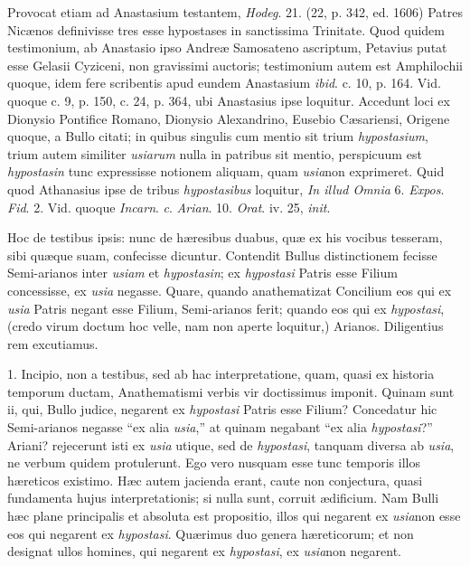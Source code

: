 Provocat
etiam ad Anastasium testantem, \emph{Hodeg}. 21. (22, p. 342, ed.
1606) Patres Nicænos definivisse tres esse hypostases in sanctissima
Trinitate. Quod quidem testimonium, ab Anastasio ipso Andreæ
Samosateno ascriptum, Petavius putat esse Gelasii Cyziceni, non
gravissimi auctoris; testimonium autem est Amphilochii quoque, idem
fere scribentis apud eundem Anastasium \emph{ibid}. c. 10, p.
164. Vid. quoque c. 9, p. 150, c. 24, p. 364, ubi Anastasius ipse
loquitur. Accedunt loci ex Dionysio Pontifice Romano, Dionysio
Alexandrino, Eusebio Cæsariensi, Origene quoque, a Bullo citati; in
quibus singulis cum mentio sit trium \emph{hypostasium}, trium autem
similiter \emph{usiarum} nulla in patribus sit mentio, perspicuum est \emph{hypostasin}
tunc expressisse notionem aliquam, quam \emph{usia}non exprimeret.
Quid quod Athanasius ipse de tribus \emph{hypostasibus} loquitur, \emph{In
illud Omnia} 6. \emph{Expos}. \emph{Fid}. 2. Vid. quoque \emph{Incarn}.
\emph{c}. \emph{Arian}. 10. \emph{Orat}. iv. 25, \emph{init}.

Hoc de
testibus ipsis: nunc de hæresibus duabus, quæ ex his vocibus
tesseram, sibi quæque suam, confecisse dicuntur. Contendit Bullus
distinctionem fecisse Semi-arianos inter \emph{usiam} et \emph{hypostasin};
ex \emph{hypostasi} Patris esse Filium concessisse, ex \emph{usia}
negasse. Quare, quando anathematizat Concilium eos qui ex \emph{usia}
Patris negant esse Filium, Semi-arianos ferit; quando eos qui ex \emph{hypostasi},
(credo virum doctum hoc velle, nam non aperte loquitur,) Arianos.
Diligentius rem excutiamus.

1. Incipio,
non a testibus, sed ab hac interpretatione, quam, quasi ex historia
temporum ductam, Anathematismi verbis vir doctissimus imponit. Quinam
sunt ii, qui, Bullo judice, negarent ex \emph{hypostasi} Patris esse
Filium? Concedatur hic Semi-arianos negasse ``ex alia \emph{usia},'' at
quinam negabant ``ex alia \emph{hypostasi}?'' Ariani? rejecerunt isti ex
\emph{usia} utique, sed de \emph{hypostasi}, tanquam diversa ab \emph{usia},
ne verbum quidem protulerunt. Ego vero nusquam esse tunc temporis
illos hæreticos existimo. Hæc autem jacienda erant, caute non
conjectura, quasi fundamenta hujus interpretationis; si nulla sunt,
corruit ædificium. Nam Bulli hæc plane principalis et absoluta
est propositio, illos qui negarent ex \emph{usia}non esse eos qui
negarent ex \emph{hypostasi}. Quærimus duo genera hæreticorum; et
non designat ullos homines, qui negarent ex \emph{hypostasi}, ex \emph{usia}non negarent.

